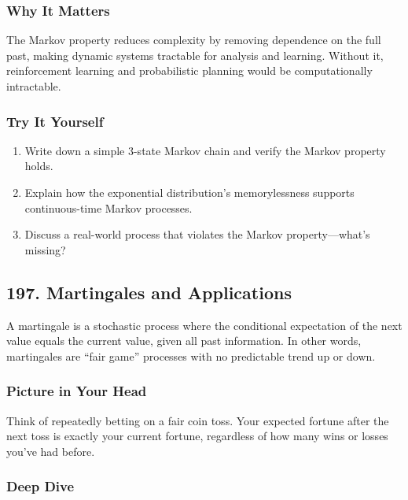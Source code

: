 \documentclass[
  letterpaper,
  DIV=11,
  numbers=noendperiod]{scrreprt}
\providecommand{\tightlist}{%
  \setlength{\itemsep}{0pt}\setlength{\parskip}{0pt}}
\begin{document}
\subsubsection{Why It Matters}\label{why-it-matters-93}

The Markov property reduces complexity by removing dependence on the
full past, making dynamic systems tractable for analysis and learning.
Without it, reinforcement learning and probabilistic planning would be
computationally intractable.

\subsubsection{Try It Yourself}\label{try-it-yourself-195}

\begin{enumerate}
\def\labelenumi{\arabic{enumi}.}
\tightlist
\item
  Write down a simple 3-state Markov chain and verify the Markov
  property holds.
\item
  Explain how the exponential distribution's memorylessness supports
  continuous-time Markov processes.
\item
  Discuss a real-world process that violates the Markov
  property---what's missing?
\end{enumerate}

\subsection{197. Martingales and
Applications}\label{martingales-and-applications}

A martingale is a stochastic process where the conditional expectation
of the next value equals the current value, given all past information.
In other words, martingales are ``fair game'' processes with no
predictable trend up or down.

\subsubsection{Picture in Your Head}\label{picture-in-your-head-196}

Think of repeatedly betting on a fair coin toss. Your expected fortune
after the next toss is exactly your current fortune, regardless of how
many wins or losses you've had before.

\subsubsection{Deep Dive}\label{deep-dive-196}
\end{document}
